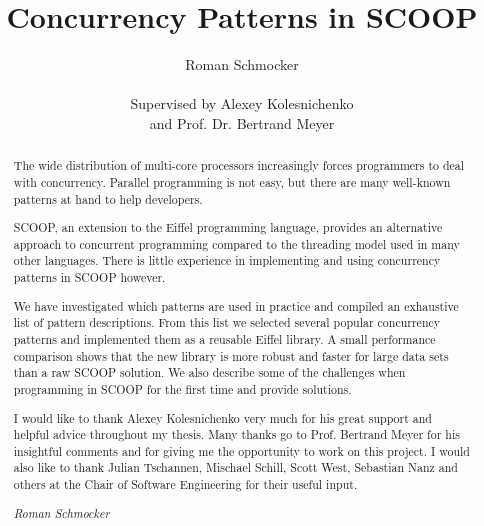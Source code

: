 \documentclass[a4paper,10pt,titlepage]{article}
\title{Concurrency Patterns in SCOOP}
\author{Roman Schmocker \\ \\ Supervised by Alexey Kolesnichenko \\ and Prof. Dr. Bertrand Meyer}
\begin{document}
\maketitle
\thispagestyle{empty}
\newpage

\begin{abstract}
\thispagestyle{plain}
\setcounter{page}{2}
The wide distribution of multi-core processors increasingly forces programmers to deal with concurrency.
Parallel programming is not easy, but there are many well-known patterns at hand to help developers.

SCOOP, an extension to the Eiffel programming language, provides an alternative approach to concurrent programming compared to the threading mo\-del used in many other languages.
There is little experience in implementing and using concurrency patterns in SCOOP however.

We have investigated which patterns are used in practice and compiled an exhaustive list of pattern descriptions.
From this list we selected several popular concurrency patterns and implemented them as a reusable Eiffel library.
A small performance comparison shows that the new library is more robust and faster for large data sets than a raw SCOOP solution.
We also describe some of the challenges when programming in SCOOP for the first time and provide solutions.
\end{abstract}

\renewcommand{\abstractname}{Acknowledgements}
\begin{abstract}
\thispagestyle{plain}
\setcounter{page}{3}
I would like to thank Alexey Kolesnichenko very much for his great support and helpful advice throughout my thesis.
Many thanks go to Prof. Bertrand Meyer for his insightful comments and for giving me the opportunity to work on this project.
I would also like to thank Julian Tschannen, Mischael Schill, Scott West, Sebastian Nanz and others at the Chair of Software Engineering for their useful input.

\emph{Roman Schmocker}
\end{abstract}


\setcounter{page}{4}
\tableofcontents

\newpage
{}
\end{document}
